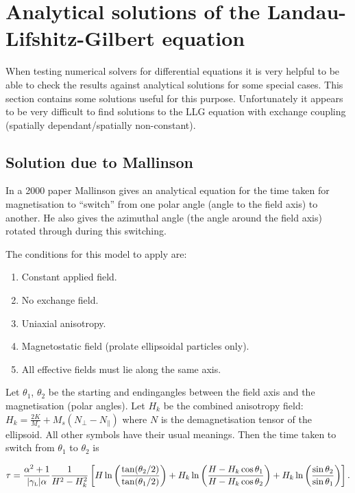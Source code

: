 \section{Analytical solutions of the Landau-Lifshitz-Gilbert equation}

When testing numerical solvers for differential equations it is very
helpful to be able to check the results against analytical solutions for
some special cases. This section contains some solutions useful for this
purpose.
Unfortunately it appears to be very difficult to find solutions to the LLG equation with exchange coupling (\ie spatially dependant/spatially non-constant).

\subsection{Solution due to Mallinson}

In a 2000 paper\cite{Mallinson2000} Mallinson gives an analytical equation for the time taken for magnetisation to ``switch'' from one polar angle (angle to the field axis) to another.
He also gives the azimuthal angle (the angle around the field axis) rotated through during this switching.

The conditions for this model to apply are:
\begin{enumerate}
\item Constant applied field.
\item No exchange field.
\item Uniaxial anisotropy.
\item Magnetostatic field (prolate ellipsoidal particles only).
\item All effective fields must lie along the same axis.
\end{enumerate}

Let $\theta_1$, $\theta_2$ be the starting and endingangles between the field axis and the magnetisation (\ie polar angles). Let $H_k$ be the combined anisotropy field: $H_k = \frac{2 K}{M_s} + M_s(N_\perp - N_\parallel)$ where $N$ is the demagnetisation tensor of the ellipsoid. All other symbols have their usual meanings. Then the time taken to switch from $\theta_1$ to $\theta_2$ is

\begin{equation}
  \tau = \frac{\alpha^2 +1}{{|\gamma_{\text{\tiny{L}}}|} \alpha} \frac{1}{H^2 - H_k^2}
  \left[ H \ln \left( \frac{\tan(\theta_2/2)}{\tan(\theta_1/2)} \right)
       + H_k \ln \left( \frac{H - H_k \cos\theta_1}{H - H_k \cos\theta_2} \right)
       + H_k \ln \left( \frac{\sin\theta_2}{\sin\theta_1} \right)
    \right].
\end{equation}

